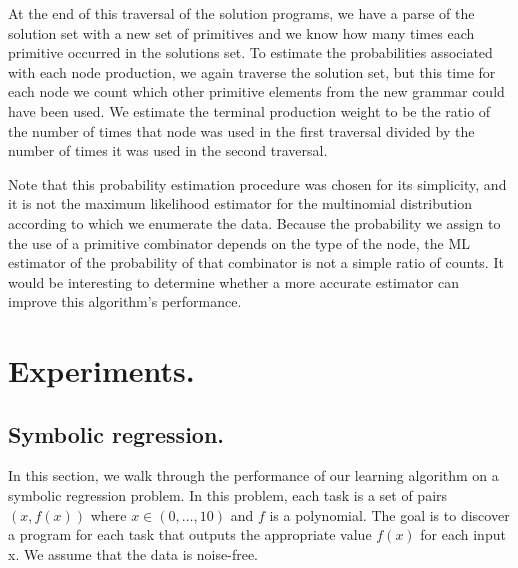 \documentclass{article}
\begin{document}
At the end of this traversal of the solution programs, we have a parse
of the solution set with a new set of primitives and we know how many
times each primitive occurred in the solutions set. To estimate the
probabilities associated with each node production, we again traverse
the solution set, but this time for each node we count which other
primitive elements from the new grammar could have been used. We
estimate the terminal production weight to be the ratio of the number
of times that node was used in the first traversal divided by the
number of times it was used in the second traversal. 

Note that this probability estimation procedure was chosen for its
simplicity, and it is not the maximum likelihood estimator for the
multinomial distribution according to which we enumerate the
data. Because the probability we assign to the use of a primitive
combinator depends on the type of the node, the ML estimator of the
probability of that combinator is not a simple ratio of counts. It
would be interesting to determine whether a more accurate estimator
can improve this algorithm's performance.

\section{Experiments.}
\subsection{Symbolic regression.}
\label{sec:symreg}

In this section, we walk through the performance of our learning
algorithm on a symbolic regression problem. In this problem,
each task is a set of pairs $ (x, f(x))$ where $x \in (0, \dots, 10)$
and $f$ is a polynomial. The goal is to discover a program for each
task that outputs the appropriate value $f(x)$ for each input x. We
assume that the data is noise-free.


\end{document}
